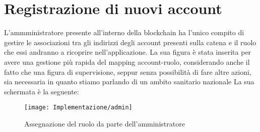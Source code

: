 \section{Registrazione di nuovi account}
%
L'ammministratore presente all'interno della blockchain ha l'unico compito di gestire le associazioni tra gli indirizzi degli account presenti sulla catena e il ruolo che essi andranno a ricoprire nell'applicazione. La sua figura è stata inserita per avere una gestione più rapida del mapping account-ruolo, considerando anche il fatto che una figura di supervisione, seppur senza possibilità di fare altre azioni, sia necessaria in quanto stiamo parlando di un ambito sanitario nazionale La sua schermata è la seguente:
%
\begin{figure}[H]
	\centering
	\texttt{[image: Implementazione/admin]}
	\caption{Assegnazione del ruolo da parte dell'amministratore}
	\label{fig:assegnazione del ruolo da parte dell'amministratore}
\end{figure}
% 
